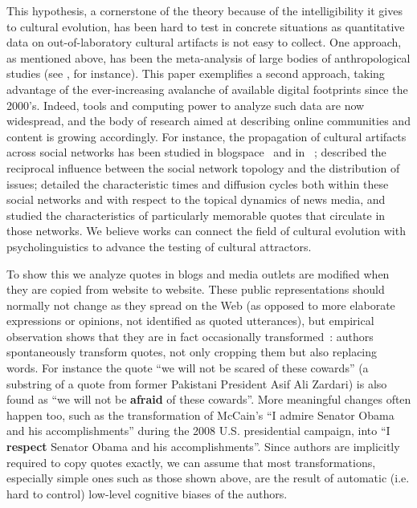 \begin{new}
This hypothesis, a cornerstone of the theory because of the intelligibility it gives to cultural evolution, has been hard to test in concrete situations as quantitative data on out-of-laboratory cultural artifacts is not easy to collect.
One approach, as mentioned above, has been the meta-analysis of large bodies of anthropological studies (see \citealp{miton_universal_2015}, for instance).
This paper exemplifies a second approach, taking advantage of the ever-increasing avalanche of available digital footprints since the 2000's.
Indeed, tools and computing power to analyze such data are now widespread, and the body of research aimed at describing online communities and content is growing accordingly.
For instance, the propagation of cultural artifacts across social networks has been studied in blogspace~\citep{gruhl_information_2004} and in ~\citep{liben-nowell_tracing_2008};
\citet{cointet_socio-semantic_2009} described the reciprocal influence between the social network topology and the distribution of issues;
\citet{leskovec_meme-tracking_2009} detailed the characteristic times and diffusion cycles both within these social networks and with respect to the topical dynamics of news media, and \citet{danescu-niculescu-mizil_you_2012} studied the characteristics of particularly memorable quotes that circulate in those networks.
We believe  works can connect the field of cultural evolution with psycholinguistics to advance the testing of cultural attractors.

\bigskip

To show this we analyze  quotes in blogs and media outlets are modified when they are copied from website to website.
These public representations should normally not change as they spread on the Web (as opposed to more elaborate expressions or opinions, not identified as quoted utterances), but empirical observation shows that they are in fact occasionally transformed~\citep{simmons_memes_2011}:
authors spontaneously transform quotes, not only cropping them but also replacing words.
For instance the quote ``we will not be scared of these cowards'' (a substring of a quote from former Pakistani President Asif Ali Zardari) is also found as ``we will not be \textbf{afraid} of these cowards''.
More meaningful changes often happen too, such as the transformation of McCain's ``I admire Senator Obama and his accomplishments'' during the 2008 U.S. presidential campaign, into ``I \textbf{respect} Senator Obama and his accomplishments''.
Since authors are implicitly required to copy quotes exactly, we can assume that most transformations, especially simple ones such as those shown above, are the result of automatic (\hbox{i.e.} hard to control) low-level cognitive biases of the authors.


\end{new}
